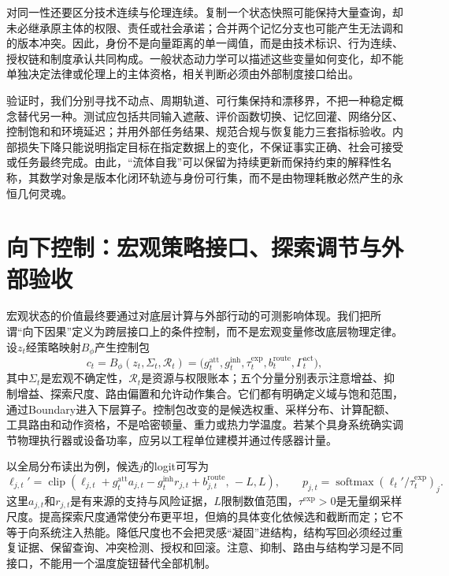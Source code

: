 对同一性还要区分技术连续与伦理连续。复制一个状态快照可能保持大量查询，却未必继承原主体的权限、责任或社会承诺；合并两个记忆分支也可能产生无法调和的版本冲突。因此，身份不是向量距离的单一阈值，而是由技术标识、行为连续、授权链和制度承认共同构成。一般状态动力学可以描述这些变量如何变化，却不能单独决定法律或伦理上的主体资格，相关判断必须由外部制度接口给出。

验证时，我们分别寻找不动点、周期轨道、可行集保持和漂移界，不把一种稳定概念替代另一种。测试应包括共同输入遮蔽、评价函数切换、记忆回灌、网络分区、控制饱和和环境延迟；并用外部任务结果、规范合规与恢复能力三套指标验收。内部损失下降只能说明指定目标在指定数据上的变化，不保证事实正确、社会可接受或任务最终完成。由此，“流体自我”可以保留为持续更新而保持约束的解释性名称，其数学对象是版本化闭环轨迹与身份可行集，而不是由物理耗散必然产生的永恒几何灵魂。

\section{向下控制：宏观策略接口、探索调节与外部验收}
\label{sec:output_characteristics_gauge_generator}

宏观状态的价值最终要通过对底层计算与外部行动的可测影响体现。我们把所谓“向下因果”定义为跨层接口上的条件控制，而不是宏观变量修改底层物理定律。设$z_t$经策略映射$B_{\phi}$产生控制包
\begin{equation}
 c_t=B_{\phi}(z_t,\Sigma_t,\mathcal R_t)
 =\bigl(g_t^{\mathrm{att}},g_t^{\mathrm{inh}},\tau_t^{\mathrm{exp}},b_t^{\mathrm{route}},\Gamma_t^{\mathrm{act}}\bigr),
\end{equation}
其中$\Sigma_t$是宏观不确定性，$\mathcal R_t$是资源与权限账本；五个分量分别表示注意增益、抑制增益、探索尺度、路由偏置和允许动作集合。它们都有明确定义域与饱和范围，通过Boundary进入下层算子。控制包改变的是候选权重、采样分布、计算配额、工具路由和动作资格，不是哈密顿量、重力或热力学温度。若某个具身系统确实调节物理执行器或设备功率，应另以工程单位建模并通过传感器计量。

以全局分布读出为例，候选$j$的logit可写为
\begin{equation}
 \ell_{j,t}'=\operatorname{clip}\!\left(\ell_{j,t}
 +g_t^{\mathrm{att}}a_{j,t}-g_t^{\mathrm{inh}}r_{j,t}
 +b_{j,t}^{\mathrm{route}},\,-L,L\right),
 \qquad p_{j,t}=\operatorname{softmax}(\ell_t'/\tau_t^{\mathrm{exp}})_j.
\end{equation}
这里$a_{j,t}$和$r_{j,t}$是有来源的支持与风险证据，$L$限制数值范围，$\tau^{\mathrm{exp}}>0$是无量纲采样尺度。提高探索尺度通常使分布更平坦，但熵的具体变化依候选和截断而定；它不等于向系统注入热能。降低尺度也不会把灵感“凝固”进结构，结构写回必须经过重复证据、保留查询、冲突检测、授权和回滚。注意、抑制、路由与结构学习是不同接口，不能用一个温度旋钮替代全部机制。

